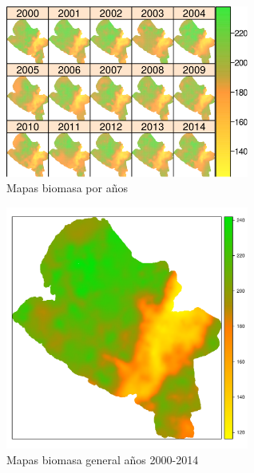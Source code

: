 \begin{figure}
  \centering
  \includegraphics[width = 8cm]{mapYearsBiomass.pdf}
  \caption{Mapas biomasa por años}
  \label{fig:biomasaAnio}
\end{figure}

\begin{figure}
  \centering
  \includegraphics[width = 8cm]{mapGeneralBiomass.pdf}
  \caption{Mapas biomasa general años 2000-2014}
  \label{fig:biomasaTotal}
\end{figure}
